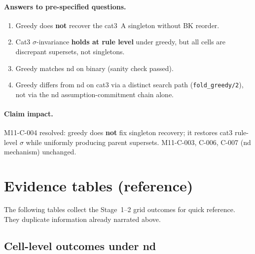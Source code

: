 \documentclass[11pt,a4paper]{article}
\begin{document}
\paragraph{Answers to pre-specified questions.}
\begin{enumerate}
  \item Greedy does \textbf{not} recover the cat3~A singleton without BK reorder.
  \item Cat3 $\sigma$-invariance \textbf{holds at rule level} under greedy, but all cells
  are discrepant supersets, not singletons.
  \item Greedy matches nd on binary (sanity check passed).
  \item Greedy differs from nd on cat3 via a distinct search path (\texttt{fold\_greedy/2}),
  not via the nd assumption-commitment chain alone.
\end{enumerate}

\paragraph{Claim impact.} M11-C-004 resolved: greedy does \textbf{not} fix singleton
recovery; it restores cat3 rule-level $\sigma$ while uniformly producing parent supersets.
M11-C-003, C-006, C-007 (nd mechanism) unchanged.

\section{Evidence tables (reference)}

The following tables collect the Stage~1--2 grid outcomes for quick reference. They duplicate
information already narrated above.

\subsection{Cell-level outcomes under nd}
\end{document}
